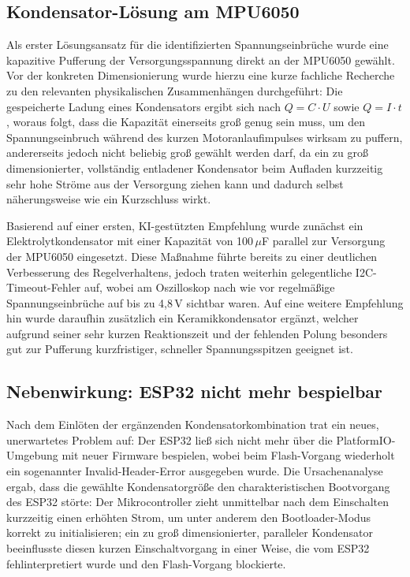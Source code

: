 \documentclass[12pt,ngerman,numbers=noenddot,abstracton,headsepline]{scrreprt}
\begin{document}
\subsection{Kondensator-Lösung am MPU6050}
\label{subsec:kondensator_loesung}

Als erster Lösungsansatz für die identifizierten Spannungseinbrüche wurde eine kapazitive Pufferung der Versorgungsspannung direkt an der MPU6050 gewählt. Vor der konkreten Dimensionierung wurde hierzu eine kurze fachliche Recherche zu den relevanten physikalischen Zusammenhängen durchgeführt: Die gespeicherte Ladung eines Kondensators ergibt sich nach $Q = C \cdot U$ sowie $Q = I \cdot t$, woraus folgt, dass die Kapazität einerseits groß genug sein muss, um den Spannungseinbruch während des kurzen Motoranlaufimpulses wirksam zu puffern, andererseits jedoch nicht beliebig groß gewählt werden darf, da ein zu groß dimensionierter, vollständig entladener Kondensator beim Aufladen kurzzeitig sehr hohe Ströme aus der Versorgung ziehen kann und dadurch selbst näherungsweise wie ein Kurzschluss wirkt.

Basierend auf einer ersten, KI-gestützten Empfehlung wurde zunächst ein Elektrolytkondensator mit einer Kapazität von 100\,$\mu$F parallel zur Versorgung der MPU6050 eingesetzt. Diese Maßnahme führte bereits zu einer deutlichen Verbesserung des Regelverhaltens, jedoch traten weiterhin gelegentliche I2C-Timeout-Fehler auf, wobei am Oszilloskop nach wie vor regelmäßige Spannungseinbrüche auf bis zu 4,8\,V sichtbar waren. Auf eine weitere Empfehlung hin wurde daraufhin zusätzlich ein Keramikkondensator ergänzt, welcher aufgrund seiner sehr kurzen Reaktionszeit und der fehlenden Polung besonders gut zur Pufferung kurzfristiger, schneller Spannungsspitzen geeignet ist.

\subsection{Nebenwirkung: ESP32 nicht mehr bespielbar}
\label{subsec:esp32_bespielbar}

Nach dem Einlöten der ergänzenden Kondensatorkombination trat ein neues, unerwartetes Problem auf: Der ESP32 ließ sich nicht mehr über die PlatformIO-Umgebung mit neuer Firmware bespielen, wobei beim Flash-Vorgang wiederholt ein sogenannter Invalid-Header-Error ausgegeben wurde. Die Ursachenanalyse ergab, dass die gewählte Kondensatorgröße den charakteristischen Bootvorgang des ESP32 störte: Der Mikrocontroller zieht unmittelbar nach dem Einschalten kurzzeitig einen erhöhten Strom, um unter anderem den Bootloader-Modus korrekt zu initialisieren; ein zu groß dimensionierter, paralleler Kondensator beeinflusste diesen kurzen Einschaltvorgang in einer Weise, die vom ESP32 fehlinterpretiert wurde und den Flash-Vorgang blockierte.
\end{document}
